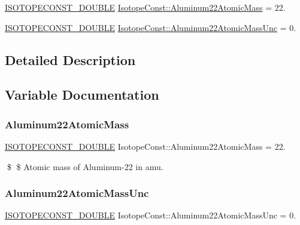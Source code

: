 \begin{DoxyCompactItemize}
\item 
\mbox{\hyperlink{group___isotope_const-_macros_ga8f45a7272ce02c0b4c65c44636ed719a}{I\+S\+O\+T\+O\+P\+E\+C\+O\+N\+S\+T\+\_\+\+D\+O\+U\+B\+LE}} \mbox{\hyperlink{group___isotope_const-_aluminum-_al22_ga40fd37c20e63016c1cd6e5f82b6c06da}{Isotope\+Const\+::\+Aluminum22\+Atomic\+Mass}} = 22.
\item 
\mbox{\hyperlink{group___isotope_const-_macros_ga8f45a7272ce02c0b4c65c44636ed719a}{I\+S\+O\+T\+O\+P\+E\+C\+O\+N\+S\+T\+\_\+\+D\+O\+U\+B\+LE}} \mbox{\hyperlink{group___isotope_const-_aluminum-_al22_ga7415f44a8a2a6b9daf072fc3c03408f0}{Isotope\+Const\+::\+Aluminum22\+Atomic\+Mass\+Unc}} = 0.
\end{DoxyCompactItemize}


\subsection{Detailed Description}


\subsection{Variable Documentation}
\mbox{\label{group___isotope_const-_aluminum-_al22_ga40fd37c20e63016c1cd6e5f82b6c06da}} 
\subsubsection{\texorpdfstring{Aluminum22\+Atomic\+Mass}{Aluminum22AtomicMass}}
{\footnotesize\ttfamily \mbox{\hyperlink{group___isotope_const-_macros_ga8f45a7272ce02c0b4c65c44636ed719a}{I\+S\+O\+T\+O\+P\+E\+C\+O\+N\+S\+T\+\_\+\+D\+O\+U\+B\+LE}} Isotope\+Const\+::\+Aluminum22\+Atomic\+Mass = 22.}

\$ \$ Atomic mass of Aluminum-\/22 in amu. \mbox{\label{group___isotope_const-_aluminum-_al22_ga7415f44a8a2a6b9daf072fc3c03408f0}} 
\subsubsection{\texorpdfstring{Aluminum22\+Atomic\+Mass\+Unc}{Aluminum22AtomicMassUnc}}
{\footnotesize\ttfamily \mbox{\hyperlink{group___isotope_const-_macros_ga8f45a7272ce02c0b4c65c44636ed719a}{I\+S\+O\+T\+O\+P\+E\+C\+O\+N\+S\+T\+\_\+\+D\+O\+U\+B\+LE}} Isotope\+Const\+::\+Aluminum22\+Atomic\+Mass\+Unc = 0.}

